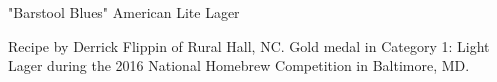 \stylesection{\styleamericanlightlager}

\begin{recipe}{"Barstool Blues" American Lite Lager} %

\begin{aboutblock}
Recipe by Derrick Flippin of Rural Hall, NC. Gold medal in Category 1: Light Lager
during the 2016 National Homebrew Competition in Baltimore, MD.
\sourceaha
\end{aboutblock}


\begin{methodandtiming}

\begin{mashsteps}

\end{mashsteps}

\begin{fermentationsteps}
\end{fermentationsteps}

\end{methodandtiming}

\recipebreak

\begin{ingredientsblock}

\begin{malts}
\end{malts}

\begin{hops}
\end{hops}


\end{ingredientsblock}

\end{recipe}

